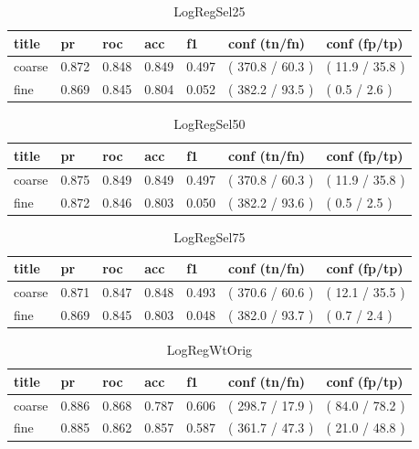 \documentclass[ms]{nuthesis}
\begin{document}
\FloatBarrier
\begin{table}[h]
\centering
\begin{tabular}{|l||l||l||l||l||l||l|}\toprule
title & pr & roc & acc & f1 & conf (tn/fn) & conf (fp/tp) \\ \midrule
coarse & 0.872 & 0.848 & 0.849 & 0.497 & ( 370.8 / 60.3 ) & ( 11.9 / 35.8 ) \\
fine & 0.869 & 0.845 & 0.804 & 0.052 & ( 382.2 / 93.5 ) & ( 0.5 / 2.6 ) \\ \bottomrule
\end{tabular}
\caption{LogRegSel25}
\label{tab:LogRegSel25}
\end{table}
\FloatBarrier


\FloatBarrier
\begin{table}[h]
\centering
\begin{tabular}{|l||l||l||l||l||l||l|}\toprule
title & pr & roc & acc & f1 & conf (tn/fn) & conf (fp/tp) \\ \midrule
coarse & 0.875 & 0.849 & 0.849 & 0.497 & ( 370.8 / 60.3 ) & ( 11.9 / 35.8 ) \\
fine & 0.872 & 0.846 & 0.803 & 0.050 & ( 382.2 / 93.6 ) & ( 0.5 / 2.5 ) \\ \bottomrule
\end{tabular}
\caption{LogRegSel50}
\label{tab:LogRegSel50}
\end{table}
\FloatBarrier

\FloatBarrier
\begin{table}[h]
\centering
\begin{tabular}{|l||l||l||l||l||l||l|}\toprule
title & pr & roc & acc & f1 & conf (tn/fn) & conf (fp/tp) \\ \midrule
coarse & 0.871 & 0.847 & 0.848 & 0.493 & ( 370.6 / 60.6 ) & ( 12.1 / 35.5 ) \\
fine & 0.869 & 0.845 & 0.803 & 0.048 & ( 382.0 / 93.7 ) & ( 0.7 / 2.4 ) \\ \bottomrule
\end{tabular}
\caption{LogRegSel75}
\label{tab:LogRegSel75}
\end{table}
\FloatBarrier


\FloatBarrier
\begin{table}[h]
\centering
\begin{tabular}{|l||l||l||l||l||l||l|}\toprule
title & pr & roc & acc & f1 & conf (tn/fn) & conf (fp/tp) \\ \midrule
coarse & 0.886 & 0.868 & 0.787 & 0.606 & ( 298.7 / 17.9 ) & ( 84.0 / 78.2 ) \\
fine & 0.885 & 0.862 & 0.857 & 0.587 & ( 361.7 / 47.3 ) & ( 21.0 / 48.8 ) \\ \bottomrule
\end{tabular}
\caption{LogRegWtOrig}
\label{tab:LogRegWtOrig}
\end{table}
\FloatBarrier
\end{document}
